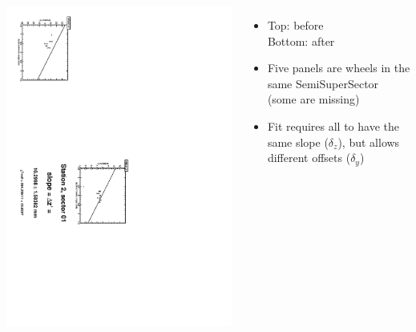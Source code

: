 \documentclass[compress]{beamer}
\begin{document}
\begin{frame}
\begin{columns}
\vfill
\includegraphics[height=\linewidth, angle=90]{zfits_after/zfit_2_01.pdf}
\begin{itemize}
\item Top: before \\ Bottom: after
\item Five panels are wheels in the same SemiSuperSector (some are missing)
\item Fit requires all to have the same slope ($\delta_z$), but allows different offsets ($\delta_y$)
\end{itemize}
\end{columns}
\end{frame}
\end{document}
